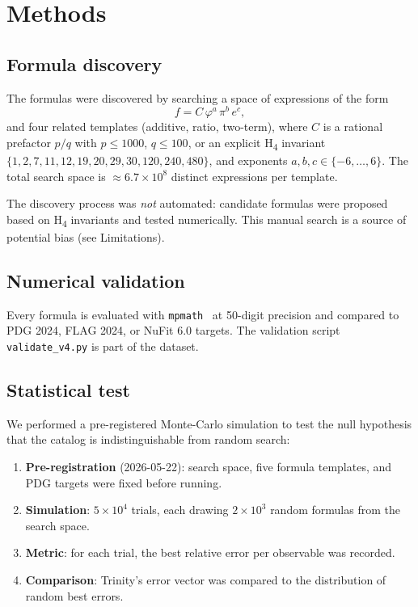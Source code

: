 \documentclass[11pt,a4paper]{article}
\begin{document}
\section{Methods}
\label{sec:methods}

\subsection{Formula discovery}

The formulas were discovered by searching a space of expressions of the
form
\begin{equation}
  f = C \, \varphi^{a} \, \pi^{b} \, e^{c},
\end{equation}
and four related templates (additive, ratio, two-term), where $C$ is a
rational prefactor $p/q$ with $p\le 1000$, $q\le 100$, or an explicit
H\textsubscript{4} invariant $\{1,2,7,11,12,19,20,29,30,120,240,480\}$,
and exponents $a,b,c\in\{-6,\dots,6\}$.  The total search space is
$\approx 6.7\times10^{8}$ distinct expressions per template.

The discovery process was \emph{not} automated: candidate formulas were
proposed based on H\textsubscript{4} invariants and tested numerically.
This manual search is a source of potential bias (see Limitations).

\subsection{Numerical validation}

Every formula is evaluated with \texttt{mpmath}\ \cite{mpmath} at
50-digit precision and compared to PDG 2024, FLAG 2024, or NuFit 6.0
targets.  The validation script \texttt{validate\_v4.py} is part of the
dataset.

\subsection{Statistical test}

We performed a pre-registered Monte-Carlo simulation to test the null
hypothesis that the catalog is indistinguishable from random search:
\begin{enumerate}
  \item \textbf{Pre-registration} (2026-05-22): search space, five
    formula templates, and PDG targets were fixed before running.
  \item \textbf{Simulation}: $5\times10^{4}$ trials, each drawing
    $2\times10^{3}$ random formulas from the search space.
  \item \textbf{Metric}: for each trial, the best relative error per
    observable was recorded.
  \item \textbf{Comparison}: Trinity's error vector was compared to the
    distribution of random best errors.
\end{enumerate}
\end{document}
